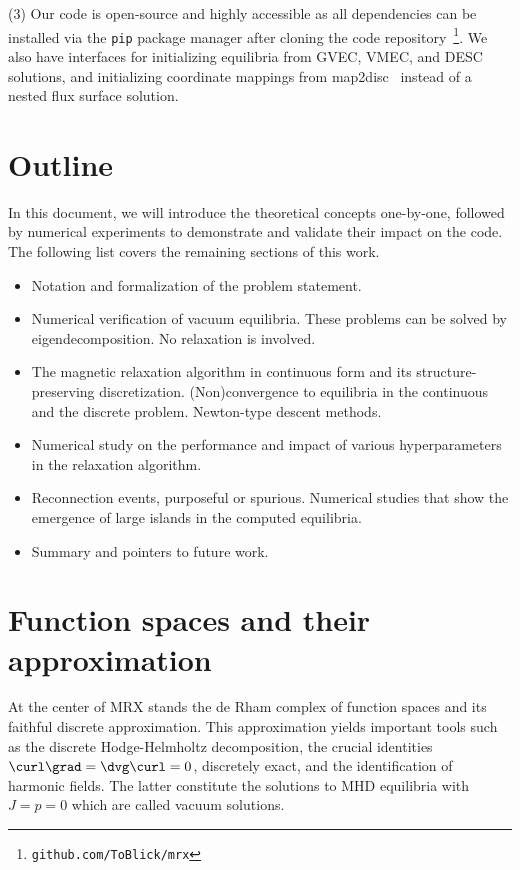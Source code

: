 \documentclass[%
 reprint,
 superscriptaddress,
 amsmath,amssymb,
 aps, nofootinbib, floatfix]{revtex4-2}
\begin{document}
(3) Our code is open-source and highly accessible as all dependencies can be installed via the \texttt{pip} package manager after cloning the code repository~\footnote{\texttt{github.com/ToBlick/mrx}}. We also have interfaces for initializing equilibria from GVEC, VMEC, and DESC solutions, and initializing coordinate mappings from map2disc~\cite{babin2025construction} instead of a nested flux surface solution. 

\section{Outline}
\label{sec:outline}

In this document, we will introduce the theoretical concepts one-by-one, followed by numerical experiments to demonstrate and validate their impact on the code. The following list covers the remaining sections of this work.

\begin{itemize}
    \item[\ref{sec:function_spaces}] Notation and formalization of the problem statement.
    \item[\ref{sec:numerics_1_vacuum}] Numerical verification of vacuum equilibria. These problems can be solved by eigendecomposition. No relaxation is involved.
    \item[\ref{sec:magnetic_relaxation}] The magnetic relaxation algorithm in continuous form and its structure-preserving discretization. (Non)convergence to equilibria in the continuous and the discrete problem. Newton-type descent methods.
    \item[\ref{sec:numerics_II_relaxation}] Numerical study on the performance and impact of various hyperparameters in the relaxation algorithm.
    \item[\ref{sec:reconnection}] Reconnection events, purposeful or spurious. Numerical studies that show the emergence of large islands in the computed equilibria.
    \item[\ref{sec:discussion}] Summary and pointers to future work.
\end{itemize}

\section{Function spaces and their approximation}
\label{sec:function_spaces}

At the center of MRX stands the de Rham complex of function spaces and its faithful discrete approximation. This approximation yields important tools such as the discrete Hodge-Helmholtz decomposition, the crucial identities $\curl \grad = \dvg \curl = 0$, discretely exact, and the identification of harmonic fields. The latter constitute the solutions to MHD equilibria with $J = p = 0$ which are called vacuum solutions.
\end{document}
